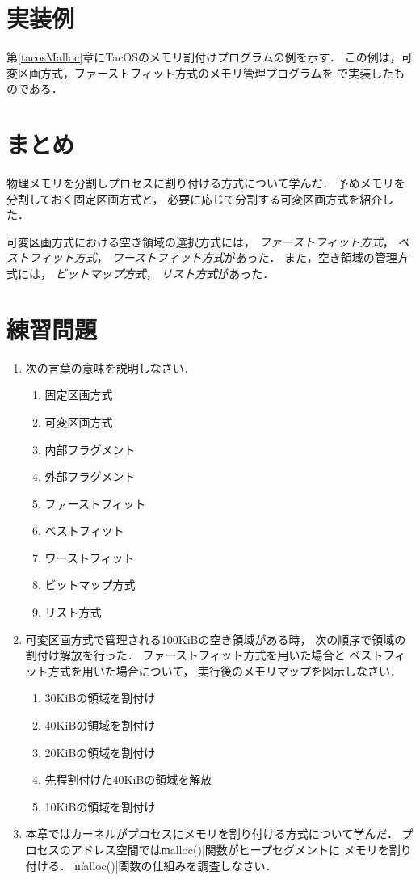 \section{実装例}
第\ref{tacosMalloc}章にTacOSのメモリ割付けプログラムの例を示す．
この例は，可変区画方式，ファーストフィット方式のメモリ管理プログラムを
{\cmml}で実装したものである．

\section{まとめ}
物理メモリを分割しプロセスに割り付ける方式について学んだ．
予めメモリを分割しておく固定区画方式と，
必要に応じて分割する可変区画方式を紹介した．

可変区画方式における空き領域の選択方式には，
\emph{ファーストフィット方式}，
\emph{ベストフィット方式}，
\emph{ワーストフィット方式}があった．
また，空き領域の管理方式には，
\emph{ビットマップ方式}，
\emph{リスト方式}があった．

\section*{練習問題}
\begin{enumerate}
  \renewcommand{\labelenumi}{\ttfamily\arabic{chapter}.\arabic{enumi}}
  \setlength{\leftskip}{1em}
\item 次の言葉の意味を説明しなさい．
  \begin{enumerate}
  \item 固定区画方式
  \item 可変区画方式
  \item 内部フラグメント
  \item 外部フラグメント
  \item ファーストフィット
  \item ベストフィット
  \item ワーストフィット
  \item ビットマップ方式
  \item リスト方式
  \end{enumerate}
\item 可変区画方式で管理される100KiBの空き領域がある時，
  次の順序で領域の割付け解放を行った．
  ファーストフィット方式を用いた場合と
  ベストフィット方式を用いた場合について，
  実行後のメモリマップを図示しなさい．
  \begin{enumerate}
  \item 30KiBの領域を割付け
  \item 40KiBの領域を割付け
  \item 20KiBの領域を割付け
  \item 先程割付けた40KiBの領域を解放
  \item 10KiBの領域を割付け
  \end{enumerate}
\item 本章ではカーネルがプロセスにメモリを割り付ける方式について学んだ．
  プロセスのアドレス空間では\|malloc()|関数がヒープセグメントに
  メモリを割り付ける．
  \|malloc()|関数の仕組みを調査しなさい．
\end{enumerate}
